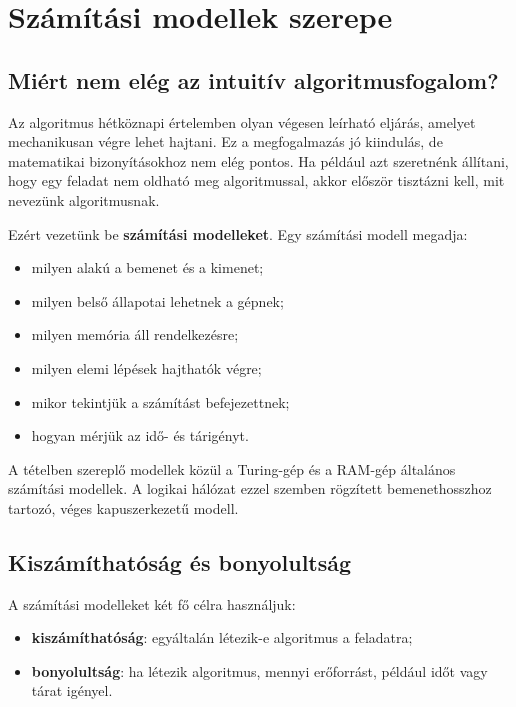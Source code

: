 \section{Számítási modellek szerepe}

\subsection{Miért nem elég az intuitív algoritmusfogalom?}

Az algoritmus hétköznapi értelemben olyan végesen leírható eljárás, amelyet mechanikusan végre lehet hajtani. Ez a megfogalmazás jó kiindulás, de matematikai bizonyításokhoz nem elég pontos. Ha például azt szeretnénk állítani, hogy egy feladat nem oldható meg algoritmussal, akkor először tisztázni kell, mit nevezünk algoritmusnak.

Ezért vezetünk be \textbf{számítási modelleket}. Egy számítási modell megadja:

\begin{itemize}
  \item milyen alakú a bemenet és a kimenet;
  \item milyen belső állapotai lehetnek a gépnek;
  \item milyen memória áll rendelkezésre;
  \item milyen elemi lépések hajthatók végre;
  \item mikor tekintjük a számítást befejezettnek;
  \item hogyan mérjük az idő- és tárigényt.
\end{itemize}

A tételben szereplő modellek közül a Turing-gép és a RAM-gép általános számítási modellek. A logikai hálózat ezzel szemben rögzített bemenethosszhoz tartozó, véges kapuszerkezetű modell.

\subsection{Kiszámíthatóság és bonyolultság}

A számítási modelleket két fő célra használjuk:

\begin{itemize}
  \item \textbf{kiszámíthatóság}: egyáltalán létezik-e algoritmus a feladatra;
  \item \textbf{bonyolultság}: ha létezik algoritmus, mennyi erőforrást, például időt vagy tárat igényel.
\end{itemize}

